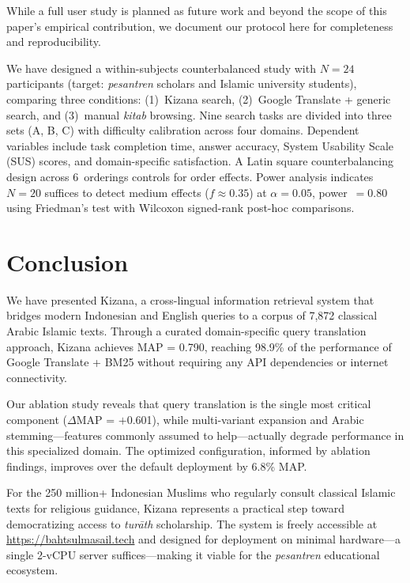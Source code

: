 \documentclass[preprint,12pt,authoryear]{elsarticle}
\begin{document}
While a full user study is planned as future work and beyond the scope of this paper's empirical contribution, we document our protocol here for completeness and reproducibility.

We have designed a within-subjects counterbalanced study with $N = 24$ participants (target: \textit{pesantren} scholars and Islamic university students), comparing three conditions: (1)~Kizana search, (2)~Google Translate + generic search, and (3)~manual \textit{kitab} browsing. Nine search tasks are divided into three sets (A, B, C) with difficulty calibration across four domains. Dependent variables include task completion time, answer accuracy, System Usability Scale (SUS) scores, and domain-specific satisfaction. A Latin square counterbalancing design across 6~orderings controls for order effects. Power analysis indicates $N = 20$ suffices to detect medium effects ($f \approx 0.35$) at $\alpha = 0.05$, power~$= 0.80$ using Friedman's test with Wilcoxon signed-rank post-hoc comparisons.

\section{Conclusion}
\label{sec:conclusion}

We have presented Kizana, a cross-lingual information retrieval system that bridges modern Indonesian and English queries to a corpus of 7,872 classical Arabic Islamic texts. Through a curated domain-specific query translation approach, Kizana achieves MAP = 0.790, reaching 98.9\% of the performance of Google Translate + BM25 without requiring any API dependencies or internet connectivity.

Our ablation study reveals that query translation is the single most critical component ($\Delta$MAP = $+$0.601), while multi-variant expansion and Arabic stemming—features commonly assumed to help—actually degrade performance in this specialized domain. The optimized configuration, informed by ablation findings, improves over the default deployment by 6.8\% MAP.

For the 250 million+ Indonesian Muslims who regularly consult classical Islamic texts for religious guidance, Kizana represents a practical step toward democratizing access to \textit{tur\={a}th} scholarship. The system is freely accessible at \url{https://bahtsulmasail.tech} and designed for deployment on minimal hardware—a single 2-vCPU server suffices—making it viable for the \textit{pesantren} educational ecosystem.
\end{document}
